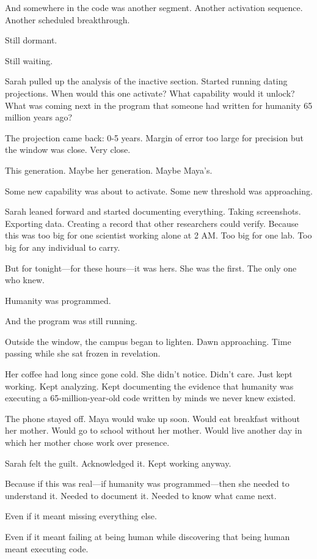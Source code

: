And somewhere in the code was another segment. Another activation sequence. Another scheduled breakthrough.

Still dormant.

Still waiting.

Sarah pulled up the analysis of the inactive section. Started running dating projections. When would this one activate? What capability would it unlock? What was coming next in the program that someone had written for humanity 65 million years ago?

The projection came back: 0-5 years. Margin of error too large for precision but the window was close. Very close.

This generation. Maybe her generation. Maybe Maya's.

Some new capability was about to activate. Some new threshold was approaching.

Sarah leaned forward and started documenting everything. Taking screenshots. Exporting data. Creating a record that other researchers could verify. Because this was too big for one scientist working alone at 2 AM. Too big for one lab. Too big for any individual to carry.

But for tonight—for these hours—it was hers. She was the first. The only one who knew.

Humanity was programmed.

And the program was still running.

Outside the window, the campus began to lighten. Dawn approaching. Time passing while she sat frozen in revelation.

Her coffee had long since gone cold. She didn't notice. Didn't care. Just kept working. Kept analyzing. Kept documenting the evidence that humanity was executing a 65-million-year-old code written by minds we never knew existed.

The phone stayed off. Maya would wake up soon. Would eat breakfast without her mother. Would go to school without her mother. Would live another day in which her mother chose work over presence.

Sarah felt the guilt. Acknowledged it. Kept working anyway.

Because if this was real—if humanity was programmed—then she needed to understand it. Needed to document it. Needed to know what came next.

Even if it meant missing everything else.

Even if it meant failing at being human while discovering that being human meant executing code.

